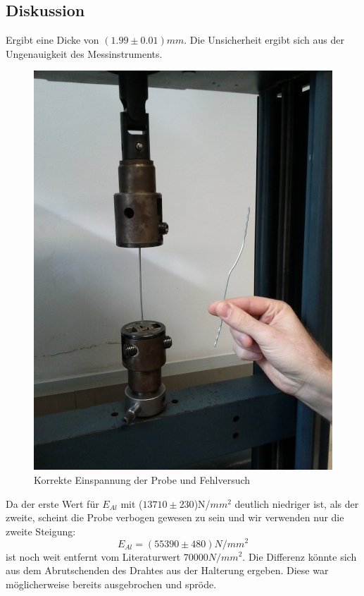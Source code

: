 \documentclass[12pt,a4paper]{article}
\begin{document}
\begin{multicols}{2}
\section{Diskussion}
Ergibt eine Dicke von \textbf{$(1.99 \pm 0.01)mm$}. Die Unsicherheit ergibt sich aus der Ungenauigkeit des Messinstruments.
\begin{figure}[H]
	\centering
  	\includegraphics[scale=0.25]{./figure/zugversuch_fail.jpg}
	\caption{Korrekte Einspannung der Probe und Fehlversuch}
	\label{fig:draht_fehlversuch}
\end{figure}
\noindent
Da der erste Wert für $E_{Al}$ mit ($13710 \pm 230$)N/$mm^2$ deutlich niedriger ist, als der zweite, scheint die Probe verbogen gewesen zu sein und wir verwenden nur die zweite Steigung: 
$$E_{Al}=(55390 \pm 480)N/mm^2$$ 
ist noch weit entfernt vom Literaturwert $70000 N/mm^2$. Die Differenz könnte sich aus dem Abrutschenden des Drahtes aus der Halterung ergeben. Diese war möglicherweise bereits ausgebrochen und spröde. \\

\end{multicols}
\end{document}
